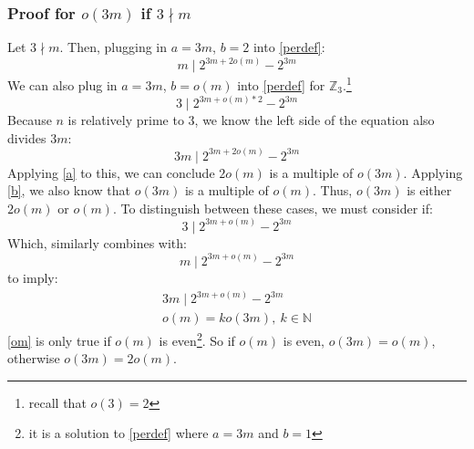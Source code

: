 \documentclass{article}
\begin{document}
  \subsubsection{Proof for  $o(3m)$ if $3 \nmid m$}
  Let $3 \nmid m$. Then, plugging in $a = 3m$, $b = 2$ into \eqref{perdef}:
  \begin{equation}
    m \mid 2^{3m+2o(m)}-2^{3m}
  \end{equation}
  We can also plug in $a = 3m$, $b = o(m)$ into \eqref{perdef} for $\mathbb{Z}_3$.\footnote{recall that $o(3) = 2$}
  \begin{equation}
    3 \mid 2^{3m+o(m)*2}-2^{3m} 
  \end{equation}
  Because $n$ is relatively prime to 3, we know the left side of the equation also divides $3m$:
  \begin{equation}
    3m \mid 2^{3m+2o(m)} - 2^{3m}
  \end{equation}
  Applying \eqref{a} to this, we can conclude $2o(m)$ is a multiple of $o(3m)$. Applying \eqref{b}, we also know that $o(3m)$ is a multiple of $o(m)$. Thus, $o(3m)$ is either $2o(m)$ or $o(m)$. To distinguish between these cases, we must consider if:
  \begin{equation}\label{om}
    3 \mid 2^{3m + o(m)} - 2^{3m}
  \end{equation}
  Which, similarly combines with:
  \begin{equation}
    m \mid 2^{3m + o(m)} - 2^{3m}
  \end{equation}
  to imply:
  \begin{align}
    3m \mid 2^{3m + o(m)} - 2^{3m} \\
    o(m) = ko(3m),\  k \in \mathbb{N}
  \end{align}
  \eqref{om} is only true if $o(m)$ is even\footnote{it is a solution to \eqref{perdef} where $a = 3m$ and $b = 1$}. So if $o(m)$ is even, $o(3m) = o(m)$, otherwise $o(3m) = 2o(m)$.
\end{document}

